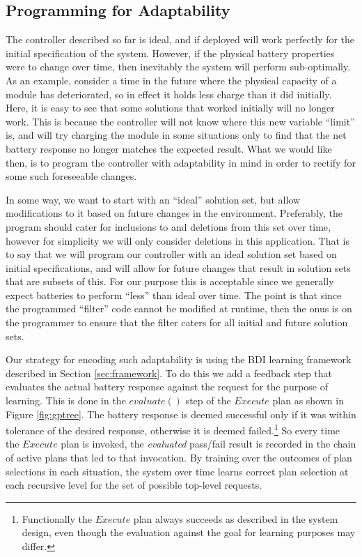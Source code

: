 \subsection{Programming for Adaptability}\label{subsec:constraints}

The controller described so far is ideal, and if deployed will work perfectly for the initial specification of the system. However, if the physical battery properties were to change over time, then inevitably the system will perform sub-optimally. As an example, consider a time in the future where the  physical capacity of a module has deteriorated, so in effect it holds less charge than it did initially. Here, it is easy to see that some solutions that worked initially will no longer work. This is because the controller will not know where this new variable ``limit'' is, and will try charging the module in some situations only to find that the net battery response no longer matches the expected result. What we would like then, is to program the controller with adaptability in mind in order to rectify for some such foreseeable changes.

In some way, we want to start with an ``ideal'' solution set, but allow modifications to it based on future changes in the environment. Preferably, the program should cater for inclusions to and deletions from this set over time, however for simplicity we will only consider deletions in this application. That is to say that we will program our controller with an ideal solution set based on initial specifications, and will allow for future changes that result in solution sets that are subsets of this. For our purpose this is acceptable since we generally expect batteries to perform ``less'' than ideal over time. The point is that since the programmed ``filter'' code cannot be modified at runtime, then the onus is on the programmer to ensure that the filter caters for all initial and future solution sets.

Our strategy for encoding such adaptability is using the BDI learning framework described in Section \ref{sec:framework}. To do this we add a feedback step that evaluates the actual battery response against the request for the purpose of learning. This is done in the $evaluate()$ step of the $Execute$ plan as shown in Figure \ref{fig:gptree}. The battery response is deemed successful only if it was within tolerance of the desired response, otherwise it is deemed failed.\footnote{Functionally the $Execute$ plan always succeeds as described in the system design, even though the evaluation against the goal for learning purposes may differ.} So every time the $Execute$ plan is invoked, the {\em evaluated} pass/fail result is recorded in the chain of active plans that led to that invocation. By training over the outcomes of plan selections in each situation, the system over time learns correct plan selection at each recursive level for the set of possible top-level requests. 

